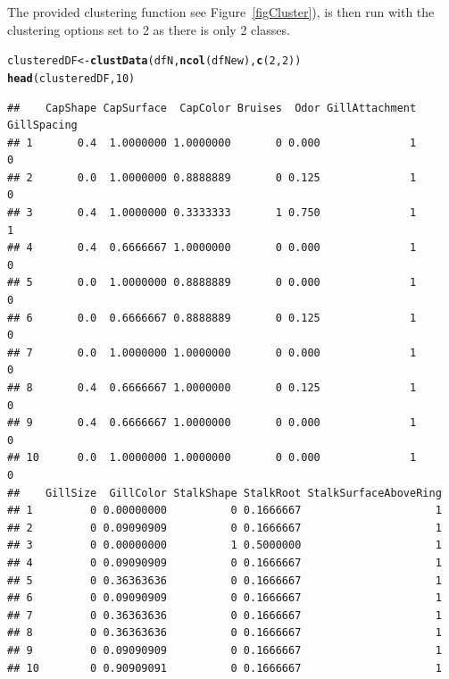 \documentclass[10pt  ,usenames, dvipsnames]{article}\usepackage[]{graphicx}\usepackage[]{color}
\makeatletter
\newcommand{\hlnum}[1]{\textcolor[rgb]{0.686,0.059,0.569}{#1}}%
\newcommand{\hlstd}[1]{\textcolor[rgb]{0.345,0.345,0.345}{#1}}%
\newcommand{\hlkwb}[1]{\textcolor[rgb]{0.69,0.353,0.396}{#1}}%
\newcommand{\hlkwd}[1]{\textcolor[rgb]{0.737,0.353,0.396}{\textbf{#1}}}%
\newenvironment{kframe}{%
 \def\at@end@of@kframe{}%
 \ifinner\ifhmode%
  \def\at@end@of@kframe{\end{minipage}}%
  \begin{minipage}{\columnwidth}%
 \fi\fi%
 \def\FrameCommand##1{\hskip\@totalleftmargin \hskip-\fboxsep
 \colorbox{shadecolor}{##1}\hskip-\fboxsep
     \hskip-\linewidth \hskip-\@totalleftmargin \hskip\columnwidth}%
 \MakeFramed {\advance\hsize-\width
   \@totalleftmargin\z@ \linewidth\hsize
   \@setminipage}}%
 {\par\unskip\endMakeFramed%
 \at@end@of@kframe}
\newenvironment{knitrout}{}{} %
\makeatother
\begin{document}
The provided clustering function see Figure~\ref{figCluster}), is then run with the clustering options set to 2 as there is only 2 classes.
\begin{knitrout}
\color{fgcolor}\begin{kframe}
\begin{alltt}
\hlstd{clusteredDF} \hlkwb{<-} \hlkwd{clustData}\hlstd{(dfN,}\hlkwd{ncol}\hlstd{(dfNew),} \hlkwd{c}\hlstd{(}\hlnum{2}\hlstd{,}\hlnum{2}\hlstd{))}
\hlkwd{head}\hlstd{(clusteredDF,}\hlnum{10}\hlstd{)}
\end{alltt}
\end{kframe}
\end{knitrout}

\begin{knitrout}
\color{fgcolor}\begin{kframe}
\begin{verbatim}
##    CapShape CapSurface  CapColor Bruises  Odor GillAttachment GillSpacing
## 1       0.4  1.0000000 1.0000000       0 0.000              1           0
## 2       0.0  1.0000000 0.8888889       0 0.125              1           0
## 3       0.4  1.0000000 0.3333333       1 0.750              1           1
## 4       0.4  0.6666667 1.0000000       0 0.000              1           0
## 5       0.0  1.0000000 0.8888889       0 0.000              1           0
## 6       0.0  0.6666667 0.8888889       0 0.125              1           0
## 7       0.0  1.0000000 1.0000000       0 0.000              1           0
## 8       0.4  0.6666667 1.0000000       0 0.125              1           0
## 9       0.4  0.6666667 1.0000000       0 0.000              1           0
## 10      0.0  1.0000000 1.0000000       0 0.000              1           0
##    GillSize  GillColor StalkShape StalkRoot StalkSurfaceAboveRing
## 1         0 0.00000000          0 0.1666667                     1
## 2         0 0.09090909          0 0.1666667                     1
## 3         0 0.00000000          1 0.5000000                     1
## 4         0 0.09090909          0 0.1666667                     1
## 5         0 0.36363636          0 0.1666667                     1
## 6         0 0.09090909          0 0.1666667                     1
## 7         0 0.36363636          0 0.1666667                     1
## 8         0 0.36363636          0 0.1666667                     1
## 9         0 0.09090909          0 0.1666667                     1
## 10        0 0.90909091          0 0.1666667                     1

\end{verbatim}
\end{kframe}
\end{knitrout}
\end{document}
